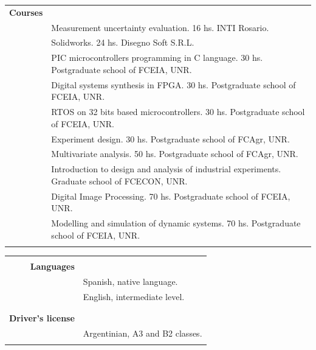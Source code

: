 \documentclass[a4paper,10pt, sans]{article}
\begin{document}
\begin{table}[H]
\begin{tabularx}{\textwidth}{r X}
    \textbf{Courses} & {}\\ [1ex]
    {} & Measurement uncertainty evaluation. 16 hs. INTI Rosario. \\  [1ex]
    {} & Solidworks. 24 hs. Disegno Soft S.R.L. \\  [1ex]
    {} & PIC microcontrollers programming in C language. 30 hs. Postgraduate school of FCEIA, UNR. \\  [1ex]
    {} & Digital systems synthesis in FPGA. 30 hs. Postgraduate school of FCEIA, UNR. \\  [1ex]
    {} & RTOS on 32 bits based microcontrollers. 30 hs. Postgraduate school of FCEIA, UNR. \\  [1ex]
    {} & Experiment design. 30 hs. Postgraduate school of FCAgr, UNR. \\  [1ex]
    {} & Multivariate analysis. 50 hs. Postgraduate school of FCAgr, UNR. \\  [1ex]
    {} & Introduction to design and analysis of industrial experiments. Graduate school of FCECON, UNR. \\  [1ex]
    {} & Digital Image Processing. 70 hs. Postgraduate school of FCEIA, UNR. \\  [1ex]
    {} & Modelling and simulation of dynamic systems. 70 hs. Postgraduate school of FCEIA, UNR. \\ \\ 
    
  \end{tabularx}
  \end{table}
  
  \begin{table}[H]
  \centering
  \begin{tabularx}{\textwidth}{r X}  
      
    \hline \\  
    \textbf{Languages} & {} \\ [1ex]
    {} & Spanish, native language. \\ [1ex]
    {} & English, intermediate level. \\ \\ \hline \\
      
    \textbf{Driver's license} & {} \\ [1ex]
    {} & Argentinian, A3 and B2 classes.\\
    
\vspace{5cm}
    
    
    
    
        
  \end{tabularx}
  \end{table}
  
\end{document}

